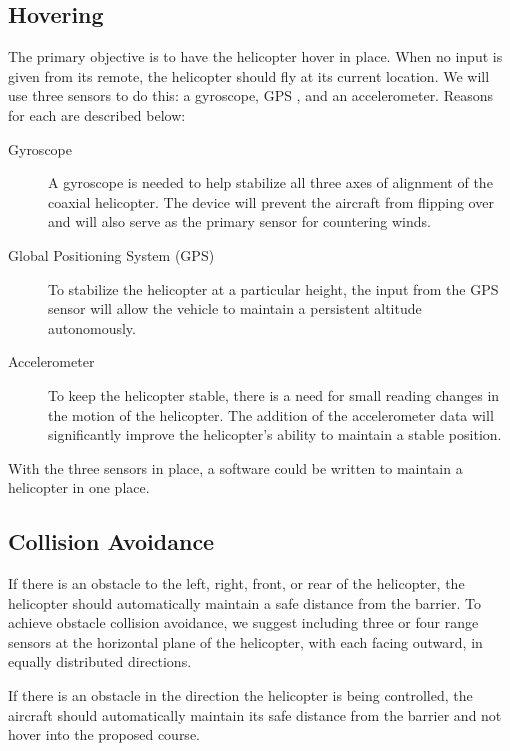 \documentclass[onecolumn, oneside, letterpaper, draftclsnofoot, 10pt, compsoc]{IEEEtran}
\begin{document}
\subsection{Hovering}
The primary objective is to have the helicopter hover in place. When no input is given from its remote, the helicopter should fly at its current location. We will use three sensors to do this: a gyroscope, GPS , and an accelerometer. Reasons for each are described below:
\begin{description}
\item[Gyroscope] A gyroscope is needed to help stabilize all three axes of alignment of the coaxial helicopter. The device will prevent the aircraft from flipping over and will also serve as the primary sensor for countering winds.
\item[Global Positioning System (GPS)] To stabilize the helicopter at a particular height, the input from the GPS sensor will allow the vehicle to maintain a persistent altitude autonomously.

\item[Accelerometer] To keep the helicopter stable, there is a need for small reading changes in the motion of the helicopter. The addition of the accelerometer data will significantly improve the helicopter’s ability to maintain a stable position.
\end{description}
With the three sensors in place, a software could be written to maintain a helicopter in one place.


\subsection{Collision Avoidance}
If there is an obstacle to the left, right, front, or rear of the helicopter, the helicopter should automatically maintain a safe distance from the barrier. To achieve obstacle collision avoidance, we suggest including three or four range sensors at the horizontal plane of the helicopter, with each facing outward, in equally distributed directions.

If there is an obstacle in the direction the helicopter is being controlled, the aircraft should automatically maintain its safe distance from the barrier and not hover into the proposed course.
\end{document}
